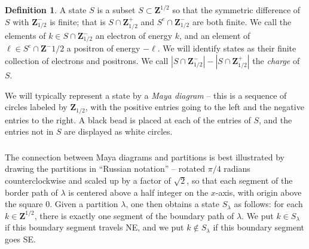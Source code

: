 \documentclass{amsart}[12pt]
\theoremstyle{definition}
\newtheorem{definition}[dummy]{Definition}
\newcommand{\Z}{\mathbf{Z}}
\begin{document}
\begin{definition}
  A state $S$ is a subset $S\subset \Z^{1/2}$ so that the symmetric difference of $S$ with $\Z^-_{1/2}$ is finite; that is $S\cap\Z^+_{1/2}$ and $S^c\cap \Z^-_{1/2}$ are both finite.  We call the elements of $k\in S\cap \Z^-_{1/2}$ an electron of energy $k$, and an element of $\ell\in S^c\cap \Z^-{1/2}$ a positron of energy $-\ell$.  We will identify states as their finite collection of electrons and positrons.  We call $|S\cap \Z^-_{1/2}|-|S\cap \Z^+_{1/2}|$ the \emph{charge} of $S$.
  
We will typically represent a state by a \emph{Maya diagram} -- this is a sequence of circles labeled by $\Z_{1/2}$, with the positive entries going to the left and the negative entries to the right.  A black bead is placed at each of the entries of $S$, and the entries not in $S$ are displayed as white circles.
\end{definition}



\subsubsection{}
The connection between Maya diagrams and partitions is best illustrated by drawing the partitions in ``Russian notation'' -- rotated $\pi/4$ radians counterclockwise and scaled up by a factor of $\sqrt{2}$, so that each segment of the border path of $\lambda$ is centered above a half integer on the $x$-axis, with origin above the square 0.  Given a partition $\lambda$, one then obtains a state $S_\lambda$ as follows: for each $k\in\Z^{1/2}$, there is exactly one segment of the boundary path of $\lambda$.  We put $k\in S_\lambda$ if this boundary segment travels NE, and we put $k\notin S_\lambda$ if this boundary segment goes SE.
\end{document}
